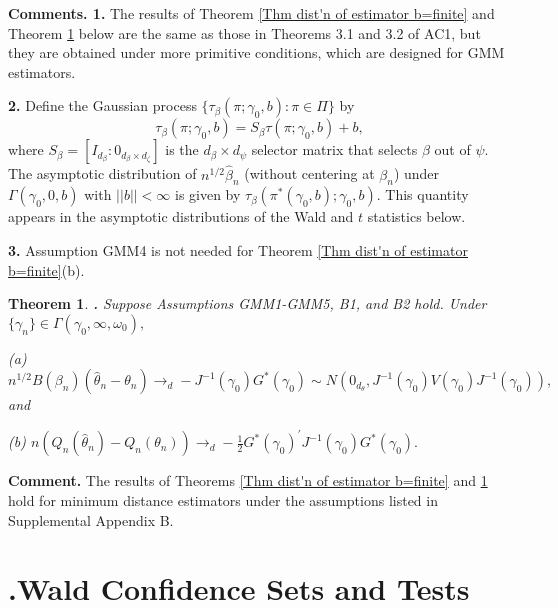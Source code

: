 \documentclass[12pt,thmsb,titlepage,final,oneside,letterpaper]{article}
\newtheorem{theorem}{Theorem}[section]
\begin{document}
\noindent \textbf{Comments. 1. }The results of Theorem \ref{Thm dist'n of
estimator b=finite} and Theorem \ref{Thm dist'n of estimator b=inf} below
are the same as those in Theorems 3.1 and 3.2 of AC1, but they are obtained
under more primitive conditions, which are designed for GMM estimators.

\textbf{2. }Define the Gaussian process $\{\tau _{\beta }(\pi ;\gamma
_{0},b):\pi \in \Pi \}$ by 
\begin{equation}
\tau _{\beta }(\pi ;\gamma _{0},b)=S_{\beta }\tau (\pi ;\gamma _{0},b)+b,
\label{Asy Distn of Betahat(pi)}
\end{equation}%
where $S_{\beta }=[I_{d_{\beta }}:0_{d_{\beta }\times d_{\zeta }}]$ is the $%
d_{\beta }\times d_{\psi }$ selector matrix that selects $\beta $ out of $%
\psi .$ The asymptotic distribution of $n^{1/2}\widehat{\beta }_{n}$
(without centering at $\beta _{n}$) under $\Gamma (\gamma _{0},0,b)$ with $%
||b||<\infty $ is given by $\tau _{\beta }(\pi ^{\ast }(\gamma
_{0},b);\gamma _{0},b).$ This quantity appears in the asymptotic
distributions of the Wald and $t$ statistics below.

\textbf{3. }Assumption GMM4 is not needed for Theorem \ref{Thm dist'n of
estimator b=finite}(b).

\begin{theorem}
\hspace{-0.08in}\textbf{. }\label{Thm dist'n of estimator b=inf}Suppose
Assumptions \emph{GMM1-GMM5, B1, }and \emph{B2} hold. Under $\{\gamma
_{n}\}\in \Gamma (\gamma _{0},\infty ,\omega _{0}),$

\noindent \emph{(a)} $n^{1/2}B(\beta _{n})(\widehat{\theta }_{n}-\theta
_{n})\rightarrow _{d}-J^{-1}(\gamma _{0})G^{\ast }(\gamma _{0})\sim
N(0_{d_{\theta }},J^{-1}(\gamma _{0})V(\gamma _{0})J^{-1}(\gamma _{0})),$ and

\noindent \emph{(b)} $n(Q_{n}(\widehat{\theta }_{n})-Q_{n}(\theta
_{n}))\rightarrow _{d}-\frac{1}{2}G^{\ast }(\gamma _{0})^{\prime
}J^{-1}(\gamma _{0})G^{\ast }(\gamma _{0}).$
\end{theorem}

\noindent \textbf{Comment. }The results of Theorems \ref{Thm dist'n of
estimator b=finite} and \ref{Thm dist'n of estimator b=inf} hold for minimum
distance estimators under the assumptions listed in Supplemental Appendix B.

\section{ \hspace{-0.34in}\textbf{.}\hspace{0.2in}Wald Confidence Sets and
Tests\label{Wald Tests Sec}}
\end{document}

